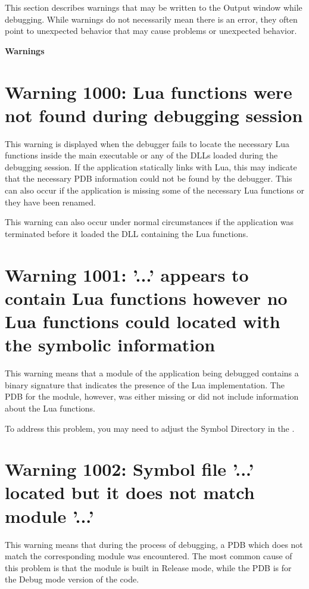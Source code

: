 This section describes warnings that may be written to the Output window while debugging. While
warnings do not necessarily mean there is an error, they often point to unexpected behavior that
may cause problems or unexpected behavior.

\textbf{Warnings}

\section{Warning 1000: Lua functions were not found during debugging session}\label{warning_1000}

This warning is displayed when the debugger fails to locate the necessary Lua functions inside
the main executable or any of the DLLs loaded during the debugging session. If the application
statically links with Lua, this may indicate that the necessary PDB information could not be
found by the debugger. This can also occur if the application is missing some of the necessary
Lua functions or they have been renamed.

This warning can also occur under normal circumstances if the application was terminated before
it loaded the DLL containing the Lua functions.

\section{Warning 1001: '...' appears to contain Lua functions however no Lua functions could located with the symbolic information}\label{warning_1001}

This warning means that a module of the application being debugged contains a binary signature
that indicates the presence of the Lua implementation.  The PDB for the module, however, was
either missing or did not include information about the Lua functions.

To address this problem, you may need to adjust the Symbol Directory in the
.

\section{Warning 1002: Symbol file '...' located but it does not match module '...'}\label{warning_1002}

This warning means that during the process of debugging, a PDB which does not match the
corresponding module was encountered. The most common cause of this problem is that the module
is built in Release mode, while the PDB is for the Debug mode version of the code.

